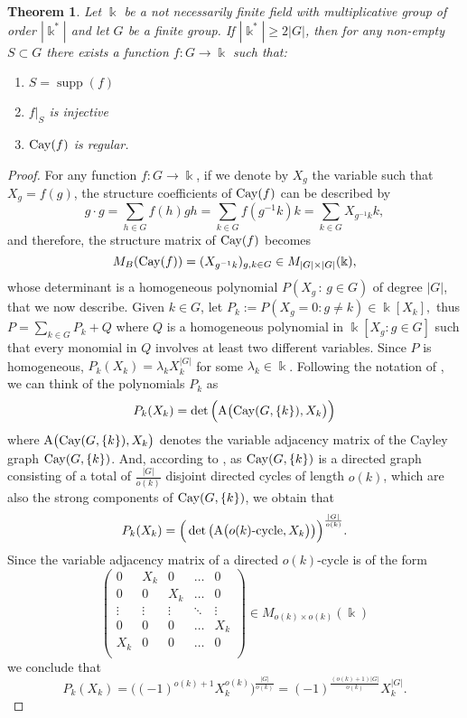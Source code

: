 \documentclass[a4paper,12pt]{amsart}
\newtheorem{theorem}{Theorem}[section]
\theoremstyle{definition}
\theoremstyle{remark}
\newcommand{\Cay}{{\rm Cay}}
\newcommand{\supp}{\operatorname{supp}}
\newcommand{\Adj}{{\rm A}}
\begin{document}
\begin{theorem}\label{th:ultimo}
Let $\Bbbk$ be a not necessarily finite field with multiplicative group of order $|\Bbbk^*|$ and let $G$ be a finite group. If $|\Bbbk^*|\geq 2 |G|$,  then for any non-empty $S\subset G$ there exists a function $f \colon G\rightarrow \Bbbk$ such that:
	\begin{enumerate}
		\item\label{th:ultimo_1} $S=\supp(f)$
		\item\label{th:ultimo_2} $f|_S$ is injective
		\item\label{th:ultimo_3} $\Cay(f)$ is regular.
	\end{enumerate}
\end{theorem}
\begin{proof}
For any function $f:G\rightarrow\Bbbk$,  if we denote by $X_g$ the variable such that $X_g=f(g)$,  the structure coefficients of  $\Cay(f)$ can be described by
$$g\cdot g=\sum_{h\in G}f(h)gh=\sum_{k\in G}f(g^{-1}k)k=\sum_{k\in G}X_{g^{-1}k}k, $$ and therefore,  the structure matrix of $\Cay(f)$ becomes
$$M_B(\Cay(f))=(X_{g^{-1}k})_{g,k\in G}\in M_{|G|\times |G|}(\Bbbk),$$
whose determinant  is a homogeneous polynomial $P(X_g\,:\,g\in G)$ of degree $|G|$, that we now describe.
Given $k\in G$, let  $P_k:=P(X_g=0: g\neq k)\in \Bbbk[X_k],$ thus $P=\sum_{k\in G} P_k + Q$ where $Q$ is a homogeneous polynomial in $\Bbbk[X_g : g\in G]$ such that every monomial in $Q$ involves at least two different variables. Since $P$ is homogeneous, $P_k(X_k)=\lambda_k X_k^{|G|}$ for some $\lambda_k\in\Bbbk$. Following the notation of \cite{harary}, we can think of the polynomials $P_k$ as 
$$P_k(X_k)=\det\Big(\Adj \big(\Cay(G,\{k\}), X_k\big)\Big)$$ where $\Adj\big(\Cay(G,\{k\}), X_k\big)$ denotes the variable adjacency matrix of the Cayley graph $\Cay(G,\{k\})$.
And, according to  \cite[Theorem 2]{harary}, as $\Cay(G,\{k\})$ is a directed graph consisting of a total of $\frac{|G|}{o(k)}$ disjoint directed cycles of length $o(k)$, which are also the strong components of $\Cay(G,\{k\})$, we obtain that
$$P_k(X_k)= \Big( \det \big( \Adj \big(o(k)\text{-cycle}, X_k \big) \big) \Big)^{\frac{|G|}{o(k)}}.$$
Since the variable adjacency matrix of a directed $o(k)$-cycle is of the form
$$\left(
	\begin{array}{ccccc}
	0 & X_{k}  & 0  & \ldots & 0\\
	0 & 0  & X_{k}  & \ldots  & 0\\
	\vdots & \vdots  & \vdots  & \ddots  & \vdots\\
	0 & 0  & 0  & \ldots & X_{k}\\
	X_{k} & 0 & 0  & \ldots & 0\\
	\end{array}
	\right) \in M_{o(k) \times o(k)} (\Bbbk)$$
we conclude that $$P_k(X_k)=\Big((-1)^{o(k)+1}X_{k}^{o(k)}\Big)^{\frac{|G|}{o(k)}}= (-1)^{\frac{(o(k)+1)|G|}{o(k)}} X_k^{|G|}.$$


\end{proof}
\end{document}
